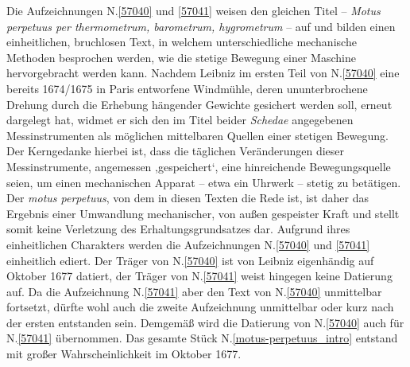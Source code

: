 \footnotesize%
\pstart%
\noindent%
Die Aufzeichnungen N.\;\ref{57040} und \ref{57041} weisen den gleichen Titel -- \textit{Motus perpetuus per thermometrum, barometrum, hygrometrum} -- auf und bilden einen einheitlichen, bruchlosen Text, in welchem unterschiedliche mechanische Methoden besprochen werden, wie die stetige Bewegung einer Maschine hervorgebracht werden kann.
Nachdem Leibniz im ersten Teil von N.\;\ref{57040} eine bereits 1674/1675 in Paris entworfene Windmühle, deren ununterbrochene Drehung durch die Erhebung hängender Gewichte gesichert werden soll, erneut dargelegt hat, widmet er sich den im Titel beider \textit{Schedae} angegebenen Messinstrumenten als möglichen mittelbaren Quellen einer stetigen Bewegung.
Der Kerngedanke hierbei ist, dass die täglichen Veränderungen dieser Messinstrumente, angemessen ,gespeichert‘, eine hinreichende Bewegungsquelle seien, um einen mechanischen Apparat -- etwa ein Uhrwerk -- stetig zu betätigen.
Der \textit{motus perpetuus}, von dem in diesen Texten die Rede ist, ist daher das Ergebnis einer Umwandlung mechanischer, von außen gespeister Kraft und stellt somit keine Verletzung des Erhaltungsgrundsatzes dar.
Aufgrund ihres einheitlichen Charakters werden die Aufzeichnungen N.\;\ref{57040} und \ref{57041} einheitlich ediert.
\pend%
\pstart%
Der Träger von N.\;\ref{57040} ist von Leibniz eigenhändig auf Oktober 1677 datiert, der Träger von N.\;\ref{57041} weist hingegen keine Datierung auf.
Da die Aufzeichnung N.\;\ref{57041} aber den Text von N.\;\ref{57040} unmittelbar fortsetzt, dürfte wohl auch die zweite Aufzeichnung unmittelbar oder kurz nach der ersten entstanden sein.
Demgemäß wird die Datierung von N.\;\ref{57040} auch für N.\;\ref{57041} übernommen.
Das gesamte Stück N.\;\ref{motus-perpetuus_intro} entstand mit großer Wahrscheinlichkeit im Oktober 1677.
\pend%
%
\frenchspacing%
\normalsize%

